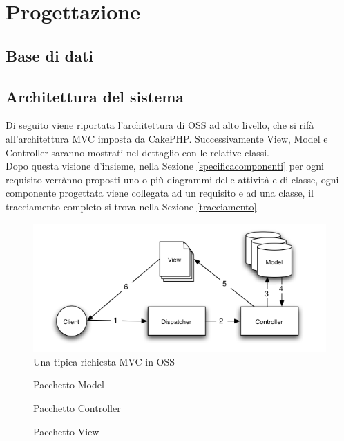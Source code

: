 \section{Progettazione}\label{progettazione}
\subsection{Base di dati}


\subsection{Architettura del sistema}
Di seguito viene riportata l'architettura di OSS ad alto livello, che si rifà all'architettura MVC imposta da CakePHP. 
Successivamente View, Model e Controller saranno mostrati nel dettaglio con le relative classi. \\

Dopo questa visione d'insieme, nella Sezione \ref{specificacomponenti} per ogni requisito verrànno proposti uno o più diagrammi delle attività e di classe,
ogni  componente progettata viene collegata ad un requisito e ad una classe, il tracciamento completo si trova nella Sezione \ref{tracciamento}.

\begin{figure}[H]
\centering
\includegraphics[width=1\textwidth]{images/basic_mvc.png}
\caption{Una tipica richiesta MVC in OSS}
\end{figure}

\begin{figure}[H]
\centering
\caption{Pacchetto Model}
\end{figure}

\begin{figure}[H]
\centering
\caption{Pacchetto Controller}
\end{figure}

\begin{figure}[H]
\centering
\caption{Pacchetto View}
\end{figure}

